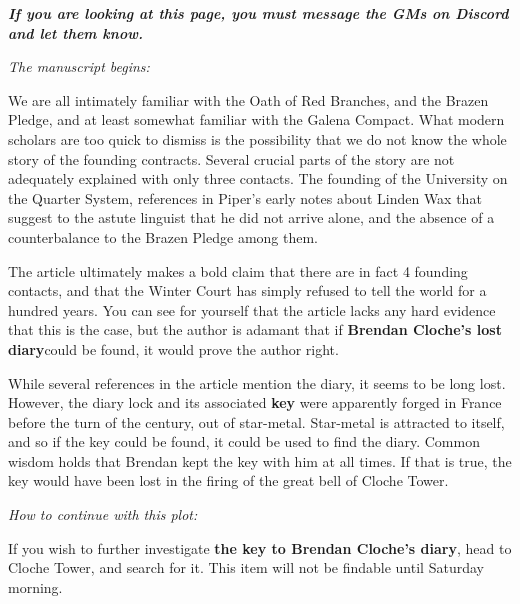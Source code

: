 \documentclass[green]{gl2018}
\begin{document}
\name{\gYanoraManuscript{}}



\emph{{\bf If you are looking at this page, you must message the GMs on Discord and let them know.}}

\emph{The manuscript begins:}
\begin{changemargin}{3cm}{3cm}
We are all intimately familiar with the Oath of Red Branches, and the Brazen Pledge, and at least somewhat familiar with the Galena Compact. What modern scholars are too quick to dismiss is the possibility that we do not know the whole story of the founding contracts. Several crucial parts of the story are not adequately explained with only three contacts. The founding of the University on the Quarter System, references in Piper’s early notes about Linden Wax that suggest to the astute linguist that he did not arrive alone, and the absence of a counterbalance to the Brazen Pledge among them.
\end{changemargin}

The article ultimately makes a bold claim that there are in fact 4 founding contacts, and that the Winter Court has simply refused to tell the world for a hundred years. You can see for yourself that the article lacks any hard evidence that this is the case, but the author is adamant that if {\bf Brendan Cloche’s lost diary}could be found, it would prove the author right.

While several references in the article mention the diary, it seems to be long lost. However, the diary lock and its associated {\bf key} were apparently forged in France before the turn of the century, out of star-metal. Star-metal is attracted to itself, and so if the key could be found, it could be used to find the diary. Common wisdom holds that Brendan kept the key with him at all times. If that is true, the key would have been lost in the firing of the great bell of Cloche Tower.

\vspace{25px}
\emph{How to continue with this plot:}
\begin{changemargin}{3cm}{3cm}
If you wish to further investigate {\bf the key to Brendan Cloche’s diary}, head to Cloche Tower, and search for it. This item will not be findable until Saturday morning.
\end{changemargin}
\end{document}
